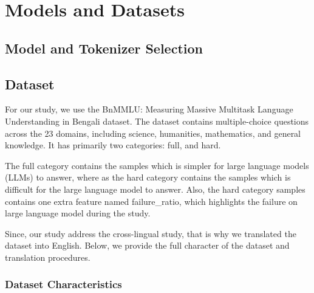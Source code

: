 \documentclass[runningheads]{llncs}
\begin{document}
\section{Models and Datasets}

\subsection{Model and Tokenizer Selection}

\subsection{Dataset}

For our study, we use the BnMMLU: Measuring Massive Multitask Language Understanding in Bengali \cite{joy-shatabda-2026-bnmmlu} dataset. The dataset contains multiple-choice questions across the 23 domains, including science, humanities, mathematics, and general knowledge. It has primarily two categories: full, and hard.

The full category contains the samples which is simpler for large language models (LLMs) to answer, where as the hard category contains the samples which is difficult for the large language model to answer. Also, the hard category samples contains one extra feature named failure\_ratio, which highlights the failure on large language model during the study.

Since, our study address the cross-lingual study, that is why we translated the dataset into English. Below, we provide the full character of the dataset and translation procedures.

\subsubsection{Dataset Characteristics}
\end{document}
